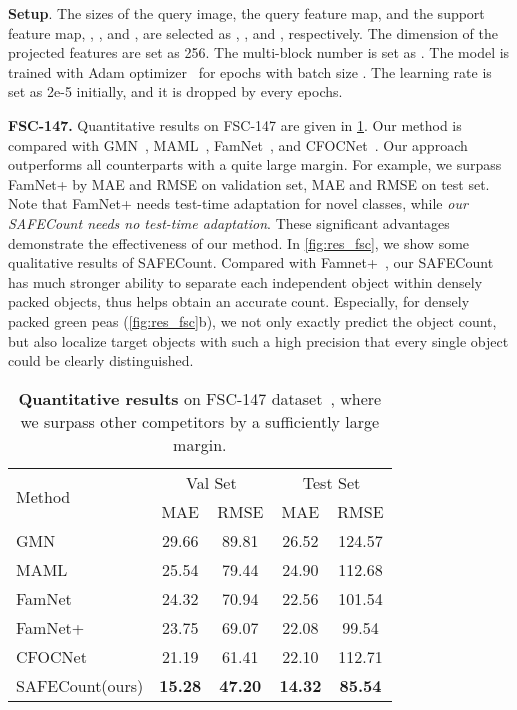 \documentclass[10pt,twocolumn,letterpaper]{article}
\newcommand{\method}{SAFECount\xspace}
\begin{document}
\vspace{2pt}\noindent \textbf{Setup}. The sizes of the query image, the query feature map, and the support feature map, , , and , are selected as , , and , respectively. The dimension of the projected features are set as 256. The multi-block number is set as . The model is trained with Adam optimizer~\cite{adam} for  epochs with batch size . The learning rate is set as 2e-5 initially, and it is dropped by  every  epochs. 

\vspace{2pt}\noindent \textbf{FSC-147.}  Quantitative results on FSC-147 are given in \cref{tab:res_fsc_147}. Our method is compared with GMN~\cite{gmn}, MAML~\cite{maml}, FamNet~\cite{famnet}, and CFOCNet~\cite{cfocnet}. Our approach outperforms all counterparts with a quite large margin. For example, we surpass FamNet+ by  MAE and  RMSE on validation set,  MAE and  RMSE on test set. Note that FamNet+ needs test-time adaptation for novel classes, while \textit{our \method needs no test-time adaptation}. These significant advantages demonstrate the effectiveness of our method. In \cref{fig:res_fsc}, we show some qualitative results of \method. Compared with Famnet+~\cite{famnet}, our \method has much stronger ability to separate each independent object within densely packed objects, thus helps obtain an accurate count. Especially, for densely packed green peas (\cref{fig:res_fsc}b), we not only exactly predict the object count, but also localize target objects with such a high precision that every single object could be clearly distinguished. 


\begin{table}[tb]
\caption{
    \textbf{Quantitative results} on FSC-147 dataset~\cite{famnet}, where we surpass other competitors by a sufficiently large margin. 
}
\setlength\tabcolsep{8pt}
\centering
\scriptsize
\begin{threeparttable}
\begin{tabular}{lcccc}
\toprule
\multirow{2}{*}{Method}
& \multicolumn{2}{c}{Val Set} & \multicolumn{2}{c}{Test Set} \\
\cmidrule{2-5}
& MAE & RMSE & MAE & RMSE \\
\midrule
GMN~\cite{gmn}         & 29.66 & 89.81 & 26.52 & 124.57 \\
MAML~\cite{maml}       & 25.54 & 79.44 & 24.90 & 112.68 \\
FamNet~\cite{famnet}   & 24.32 & 70.94 & 22.56 & 101.54  \\
FamNet+~\cite{famnet}  & 23.75 & 69.07 & 22.08 & 99.54  \\
CFOCNet~\cite{cfocnet} & 21.19 & 61.41 & 22.10 & 112.71 \\
\midrule
\method (ours) & \textbf{15.28} & \textbf{47.20} & \textbf{14.32} & \textbf{85.54} \\
\bottomrule
\end{tabular}
\end{threeparttable}
\label{tab:res_fsc_147}
\vspace{-10pt}
\end{table}
\end{document}

